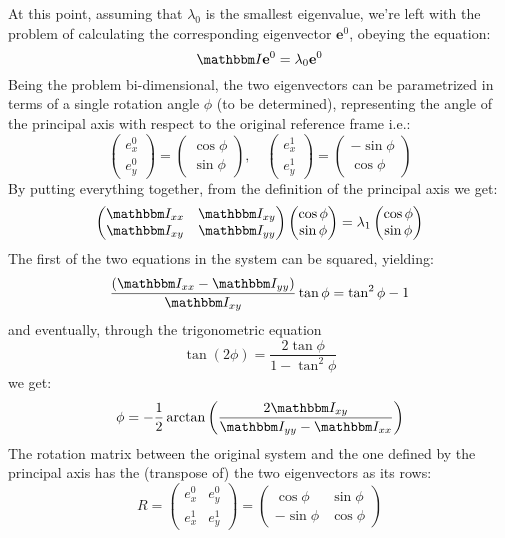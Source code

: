 \documentclass[a4paper,11pt]{article}
\newcommand{\itm}{\mathbbm I}
\newcommand{\itc}[1]{\itm_{#1}}
\begin{document}
At this point, assuming that $\lambda_0$ is the smallest eigenvalue, we're
left with the problem of calculating the corresponding eigenvector
$\mathbf{e}^0$, obeying the equation:
$$
\itm \mathbf{e}^0 = \lambda_0\mathbf{e}^0
$$
Being the problem bi-dimensional, the two eigenvectors can be parametrized in
terms of a single rotation angle $\phi$ (to be determined), representing the
angle of the principal axis with respect to the original reference frame i.e.:
\begin{equation}
  \begin{pmatrix}
    e^0_x\\
    e^0_y
  \end{pmatrix} = 
  \begin{pmatrix}
    \cos\phi\\
    \sin\phi
  \end{pmatrix},\quad
  \begin{pmatrix}
    e^1_x\\
    e^1_y
  \end{pmatrix} = 
  \begin{pmatrix}
    -\sin\phi\\
    \cos\phi
  \end{pmatrix}
\end{equation}
By putting everything together, from the definition of the principal axis
we get:
$$
\begin{pmatrix}
  \itc{xx} & \itc{xy}\\
  \itc{xy} & \itc{yy}
\end{pmatrix} 
\begin{pmatrix}
  \cos\phi\\
  \sin\phi
\end{pmatrix} = \lambda_1
\begin{pmatrix}
  \cos\phi\\
  \sin\phi
\end{pmatrix}
$$
The first of the two equations in the system can be squared, yielding:
$$
\frac{(\itc{xx} - \itc{yy})}{\itc{xy}}\tan\phi = \tan^2\phi - 1 
$$
and eventually, through the trigonometric equation
$$
\tan(2\phi) = \frac{2\tan\phi}{1 - \tan^2\phi}
$$
we get:
\begin{equation}
  \phi = -\frac{1}{2}
  \arctan \left( \frac{2\itc{xy}}{\itc{yy} - \itc{xx}} \right)
\end{equation}
The rotation matrix between the original system and the one defined by the
principal axis has the (transpose of) the two eigenvectors as its rows:
\begin{equation}
  R =
  \begin{pmatrix}
    e^0_x & e^0_y\\
    e^1_x & e^1_y
  \end{pmatrix} = 
  \begin{pmatrix}
    \cos\phi & \sin\phi\\
    -\sin\phi & \cos\phi
  \end{pmatrix}
\end{equation}
\end{document}
